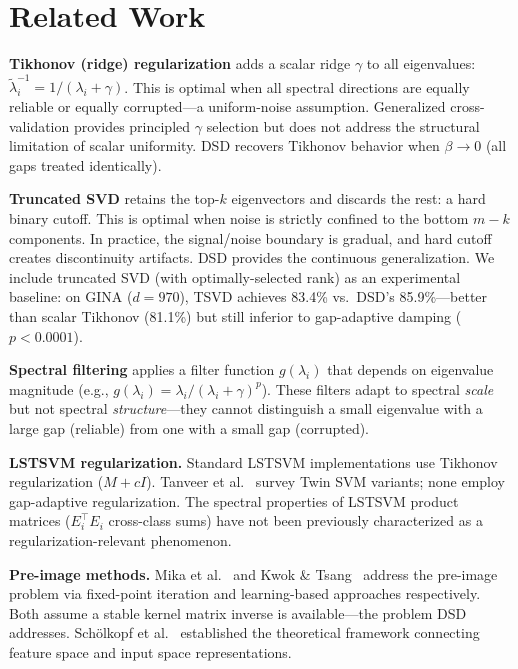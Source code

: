 \documentclass[preprint,review,12pt]{elsarticle}
\begin{document}
\section{Related Work}
\label{sec:related}

\textbf{Tikhonov (ridge) regularization} \cite{tikhonov1963solution} adds a scalar ridge $\gamma$ to all eigenvalues: $\tilde{\lambda}_i^{-1} = 1/(\lambda_i + \gamma)$. This is optimal when all spectral directions are equally reliable or equally corrupted---a uniform-noise assumption. Generalized cross-validation \cite{wahba1977practical} provides principled $\gamma$ selection but does not address the structural limitation of scalar uniformity. DSD recovers Tikhonov behavior when $\beta \to 0$ (all gaps treated identically).

\textbf{Truncated SVD} \cite{golub2013matrix} retains the top-$k$ eigenvectors and discards the rest: a hard binary cutoff. This is optimal when noise is strictly confined to the bottom $m{-}k$ components. In practice, the signal/noise boundary is gradual, and hard cutoff creates discontinuity artifacts. DSD provides the continuous generalization. We include truncated SVD (with optimally-selected rank) as an experimental baseline: on GINA ($d{=}970$), TSVD achieves 83.4\% vs.\ DSD's 85.9\%---better than scalar Tikhonov (81.1\%) but still inferior to gap-adaptive damping ($p < 0.0001$).

\textbf{Spectral filtering} \cite{engl1996regularization} applies a filter function $g(\lambda_i)$ that depends on eigenvalue magnitude (e.g., $g(\lambda_i) = \lambda_i/(\lambda_i + \gamma)^p$). These filters adapt to spectral \emph{scale} but not spectral \emph{structure}---they cannot distinguish a small eigenvalue with a large gap (reliable) from one with a small gap (corrupted).

\textbf{LSTSVM regularization.} Standard LSTSVM implementations \cite{kumar2009lstsvm, shao2011twinsvm} use Tikhonov regularization ($M + cI$). Tanveer et al.~\cite{tanveer2022comprehensive} survey Twin SVM variants; none employ gap-adaptive regularization. The spectral properties of LSTSVM product matrices ($E_i^\top E_i$ cross-class sums) have not been previously characterized as a regularization-relevant phenomenon.

\textbf{Pre-image methods.} Mika et al.~\cite{mika1999kernel} and Kwok \& Tsang~\cite{kwok2004preimage} address the pre-image problem via fixed-point iteration and learning-based approaches respectively. Both assume a stable kernel matrix inverse is available---the problem DSD addresses. Sch\"{o}lkopf et al.~\cite{scholkopf1999input} established the theoretical framework connecting feature space and input space representations.
\end{document}
